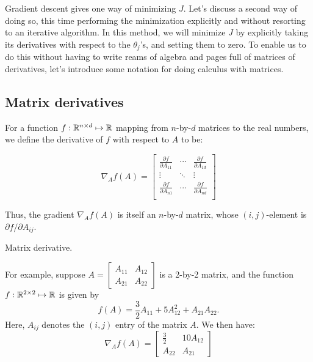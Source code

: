 Gradient descent gives one way of minimizing $J$. Let's discuss a second way
of doing so, this time performing the minimization explicitly and without
resorting to an iterative algorithm. In this method, we will minimize $J$ by
explicitly taking its derivatives with respect to the $\theta_j$'s, and setting them to
zero. To enable us to do this without having to write reams of algebra and
pages full of matrices of derivatives, let's introduce some notation for doing
calculus with matrices.

\subsection{Matrix derivatives}
For a function $f : \mathbb{R}^{n \times d} \mapsto \mathbb{R}$ mapping from $n$-by-$d$ matrices to the real
numbers, we define the derivative of $f$ with respect to $A$ to be:

\begin{equation}
    \nabla_A f(A) = \begin{bmatrix}
        \frac{\partial f}{\partial A_{11}} & \cdots & \frac{\partial f}{\partial A_{1d}} \\
        \vdots & \ddots & \vdots \\
        \frac{\partial f}{\partial A_{n1}} & \cdots & \frac{\partial f}{\partial A_{nd}} \\
    \end{bmatrix}
\end{equation}

Thus, the gradient $\nabla_A f(A)$ is itself an $n$-by-$d$ matrix, whose $(i,j)$-element is
$\partial f / \partial A_{ij}$.

\begin{example}
    \caption{\label{ex:matrix_derivative}Matrix derivative.}

    For example, suppose $A =
    \begin{bmatrix}
        A_{11} & A_{12} \\
        A_{21} & A_{22}
    \end{bmatrix}$
    is a 2-by-2 matrix, and the function $f : \mathbb{R}^{2\times2} \mapsto \mathbb{R}$ is given by
    \begin{equation*}
        f(A) = \frac 3 2 A_{11} + 5 A_{12}^2 + A_{21}A_{22}\text{.}
    \end{equation*}
    Here, $A_{ij}$ denotes the $(i,j)$ entry of the matrix $A$. We then have:
    \begin{equation*}
        \nabla_A f(A) =
        \begin{bmatrix}
            \frac 3 2 & 10 A_{12} \\
            A_{22} & A_{21}
        \end{bmatrix}
    \end{equation*}
\end{example}


